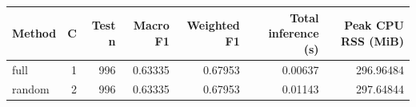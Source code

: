 \begin{tabular}{lrrrrrr}
\toprule
Method & C & Test n & Macro F1 & Weighted F1 & Total inference (s) & Peak CPU RSS (MiB) \\
\midrule
full & 1 & 996 & 0.63335 & 0.67953 & 0.00637 & 296.96484 \\
random & 2 & 996 & 0.63335 & 0.67953 & 0.01143 & 297.64844 \\
\bottomrule
\end{tabular}
